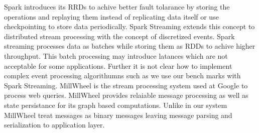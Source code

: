 Spark\cite{boyd2011distributed} introduces its RRDs\cite{zaharia2012resilient} to achive better fault tolarance by storing the operations and replaying them instead of replicating data itself or use checkpointing to store data periodically. Spark Streaming\cite{murray2013naiad} extends this concept to distributed stream processing with the concept of discretized events. Spark streaming\cite{murray2013naiad} processes data as batches while storing them as RDDs \cite{agarwal2011reliable} to achive higher throughput. This batch processing may introduce latances which are not acceptable for some applications. Further it is not clear how to implement complex event processing algorithumns such as we use our bench marks with Spark Streaming. MillWheel\cite{zaharia2013discretized} is the stream processing system used at Google to process web queries. MillWheel provides relaiable message processing as well as state persistance for its graph based computations. Unlike in our system MillWheel treat messages as binary messages leaving message parsing and serialization to application layer. 
